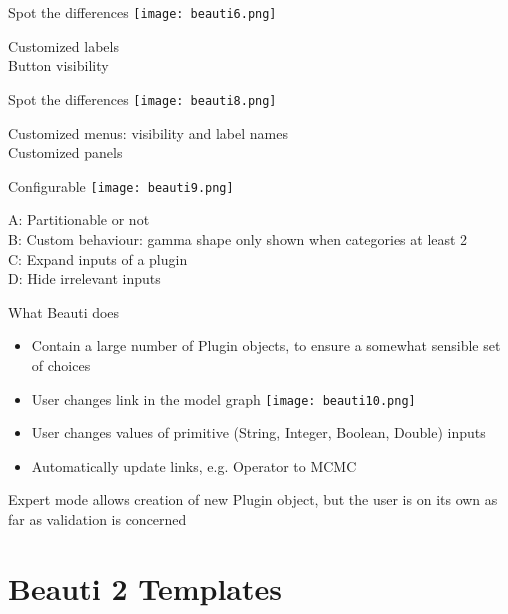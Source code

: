 \documentclass{beamer}
\theoremstyle{definition}
\begin{document}
\begin{frame}[containsverbatim]{Spot the differences}
\texttt{[image: beauti6.png]}

Customized labels\\
Button visibility
\end{frame}
\begin{frame}[containsverbatim]{Spot the differences}
\texttt{[image: beauti8.png]}

Customized menus: visibility and label names\\
Customized panels\\

\end{frame}

\begin{frame}[containsverbatim]{Configurable}
\texttt{[image: beauti9.png]}

A: Partitionable or not\\
B: Custom behaviour: gamma shape only shown when categories at least 2\\
C: Expand inputs of a plugin\\
D: Hide irrelevant inputs
\end{frame}


\begin{frame}[containsverbatim]{What Beauti does}

\begin{itemize}
\item Contain a large number of Plugin objects, to ensure a somewhat sensible set of choices\\
\item User changes link in the model graph
\texttt{[image: beauti10.png]}\\
\item User changes values of primitive (String, Integer, Boolean, Double) inputs\\
\item Automatically update links, e.g. Operator to MCMC\vskip0.5cm
\end{itemize}

Expert mode allows creation of new Plugin object, but the user is on its own as far as validation is concerned

\end{frame}

\section{Beauti 2 Templates}
\end{document}
